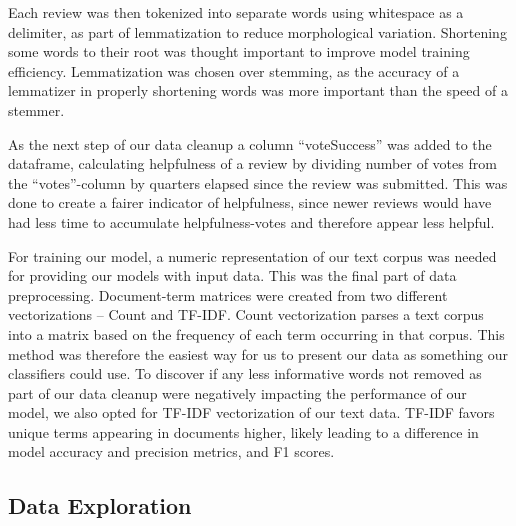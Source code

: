 \documentclass[twoside,twocolumn]{article}
\begin{document}
Each review was then tokenized into separate words using whitespace as a delimiter, as part of lemmatization to reduce morphological variation. Shortening some words to their root was thought important to improve model training efficiency. Lemmatization was chosen over stemming, as the accuracy of a lemmatizer in properly shortening words was more important than the speed of a stemmer.

As the next step of our data cleanup a column “voteSuccess” was added to the dataframe, calculating helpfulness of a review by dividing number of votes from the “votes”-column by quarters elapsed since the review was submitted. This was done to create a fairer indicator of helpfulness, since newer reviews would have had less time to accumulate helpfulness-votes and therefore appear less helpful.

For training our model, a numeric representation of our text corpus was needed for providing our models with input data. This was the final part of data preprocessing. Document-term matrices were created from two different vectorizations – Count\cite{sklearn:CountVectorizer} and TF-IDF\cite{sklearn:TfIdfVectorizer}. Count vectorization parses a text corpus into a matrix based on the frequency of each term occurring in that corpus. This method was therefore the easiest way for us to present our data as something our classifiers could use. To discover if any less informative words not removed as part of our data cleanup were negatively impacting the performance of our model, we also opted for TF-IDF vectorization of our text data. TF-IDF favors unique terms appearing in documents higher, likely leading to a difference in model accuracy and precision metrics, and F1 scores.

\subsection{Data Exploration}
\end{document}
